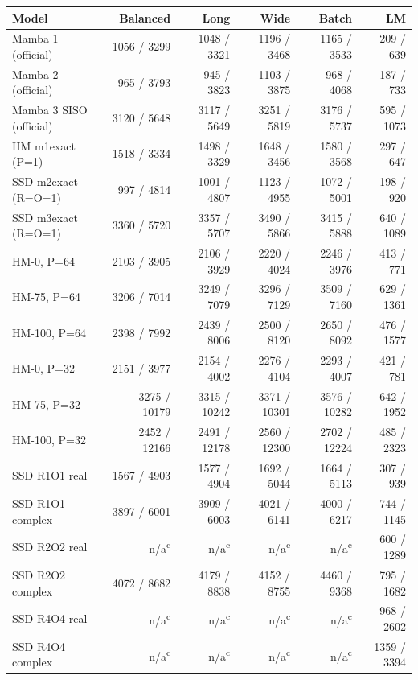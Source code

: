 \begin{tabular}{@{}lrrrrr@{}}
\toprule
Model & Balanced & Long & Wide & Batch & LM \\
\midrule
Mamba 1 (official) & 1056 / 3299 & 1048 / 3321 & 1196 / 3468 & 1165 / 3533 & 209 / 639 \\
Mamba 2 (official) & 965 / 3793 & 945 / 3823 & 1103 / 3875 & 968 / 4068 & 187 / 733 \\
Mamba 3 SISO (official) & 3120 / 5648 & 3117 / 5649 & 3251 / 5819 & 3176 / 5737 & 595 / 1073 \\
HM m1exact (P=1) & 1518 / 3334 & 1498 / 3329 & 1648 / 3456 & 1580 / 3568 & 297 / 647 \\
SSD m2exact (R=O=1) & 997 / 4814 & 1001 / 4807 & 1123 / 4955 & 1072 / 5001 & 198 / 920 \\
SSD m3exact (R=O=1) & 3360 / 5720 & 3357 / 5707 & 3490 / 5866 & 3415 / 5888 & 640 / 1089 \\
HM-0, P=64 & 2103 / 3905 & 2106 / 3929 & 2220 / 4024 & 2246 / 3976 & 413 / 771 \\
HM-75, P=64 & 3206 / 7014 & 3249 / 7079 & 3296 / 7129 & 3509 / 7160 & 629 / 1361 \\
HM-100, P=64 & 2398 / 7992 & 2439 / 8006 & 2500 / 8120 & 2650 / 8092 & 476 / 1577 \\
HM-0, P=32 & 2151 / 3977 & 2154 / 4002 & 2276 / 4104 & 2293 / 4007 & 421 / 781 \\
HM-75, P=32 & 3275 / 10179 & 3315 / 10242 & 3371 / 10301 & 3576 / 10282 & 642 / 1952 \\
HM-100, P=32 & 2452 / 12166 & 2491 / 12178 & 2560 / 12300 & 2702 / 12224 & 485 / 2323 \\
SSD R1O1 real & 1567 / 4903 & 1577 / 4904 & 1692 / 5044 & 1664 / 5113 & 307 / 939 \\
SSD R1O1 complex & 3897 / 6001 & 3909 / 6003 & 4021 / 6141 & 4000 / 6217 & 744 / 1145 \\
SSD R2O2 real & n/a\textsuperscript{c} & n/a\textsuperscript{c} & n/a\textsuperscript{c} & n/a\textsuperscript{c} & 600 / 1289 \\
SSD R2O2 complex & 4072 / 8682 & 4179 / 8838 & 4152 / 8755 & 4460 / 9368 & 795 / 1682 \\
SSD R4O4 real & n/a\textsuperscript{c} & n/a\textsuperscript{c} & n/a\textsuperscript{c} & n/a\textsuperscript{c} & 968 / 2602 \\
SSD R4O4 complex & n/a\textsuperscript{c} & n/a\textsuperscript{c} & n/a\textsuperscript{c} & n/a\textsuperscript{c} & 1359 / 3394 \\
\bottomrule
\end{tabular}
